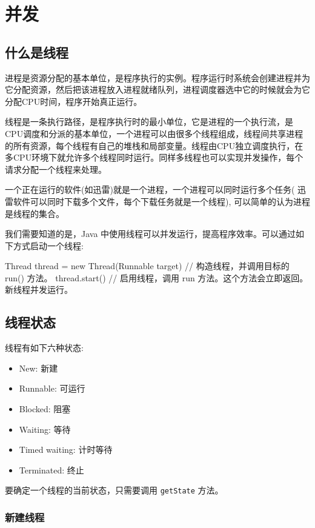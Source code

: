 \section{并发}

\subsection{什么是线程}

进程是资源分配的基本单位，是程序执行的实例。程序运行时系统会创建进程并为它分配资源，然后把该进程放入进程就绪队列，进程调度器选中它的时候就会为它分配CPU时间，程序开始真正运行。

线程是一条执行路径，是程序执行时的最小单位，它是进程的一个执行流，是CPU调度和分派的基本单位，一个进程可以由很多个线程组成，线程间共享进程的所有资源，每个线程有自己的堆栈和局部变量。线程由CPU独立调度执行，在多CPU环境下就允许多个线程同时运行。同样多线程也可以实现并发操作，每个请求分配一个线程来处理。

一个正在运行的软件(如迅雷)就是一个进程，一个进程可以同时运行多个任务( 迅雷软件可以同时下载多个文件，每个下载任务就是一个线程), 可以简单的认为进程是线程的集合。

我们需要知道的是，Java 中使用线程可以并发运行，提高程序效率。可以通过如下方式启动一个线程:
\begin{Java}
Thread thread = new Thread(Runnable target) // 构造线程，并调用目标的 run() 方法。
thread.start()  // 启用线程，调用 run 方法。这个方法会立即返回。新线程并发运行。
\end{Java}

\subsection{线程状态}

线程有如下六种状态:
\begin{itemize}
    \item New: 新建
    \item Runnable: 可运行
    \item Blocked: 阻塞
    \item Waiting: 等待
    \item Timed waiting: 计时等待
    \item Terminated: 终止
\end{itemize}

要确定一个线程的当前状态，只需要调用 \texttt{getState} 方法。

\subsubsection{新建线程}

